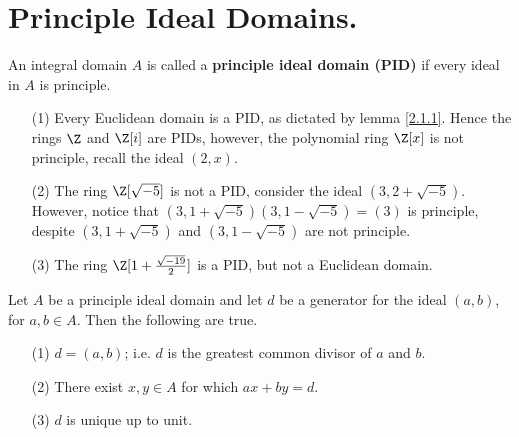 \section{Principle Ideal Domains.}

\begin{definition}
    An integral domain $A$ is called a \textbf{principle ideal domain (PID)} if
    every ideal in $A$ is principle.
\end{definition}

\begin{example}\label{2.4}
    \begin{enumerate}
        \item[(1)] Every Euclidean domain is a PID, as dictated by lemma
            \ref{2.1.1}. Hence the rings $\Z$ and  $\Z[i]$ are PIDs, however,
            the polynomial ring $\Z[x]$ is not principle, recall the ideal
            $(2,x)$.

        \item[(2)] The ring $\Z[\sqrt{-5}]$ is not a PID, consider the ideal
            $(3,2+\sqrt{-5})$. However, notice that
            $(3,1+\sqrt{-5})(3,1-\sqrt{-5})=(3)$ is principle, despite
            $(3,1+\sqrt{-5})$ and $(3,1-\sqrt{-5})$ are not principle.

        \item[(3)] The ring $\Z[1+\frac{\sqrt{-19}}{2}]$ is a PID, but not a
            Euclidean domain.
    \end{enumerate}
\end{example}

\begin{lemma}\label{1.6.1}
    Let $A$ be a principle ideal domain and let $d$ be a generator for the ideal
    $(a,b)$, for $a,b \in A$. Then the following are true.
    \begin{enumerate}
        \item[(1)] $d=(a,b)$; i.e. $d$ is the greatest common divisor of $a$ and
            $b$.

        \item[(2)] There exist $x,y \in A$ for which  $ax+by=d$.

        \item[(3)] $d$ is unique up to unit.
    \end{enumerate}
\end{lemma}

